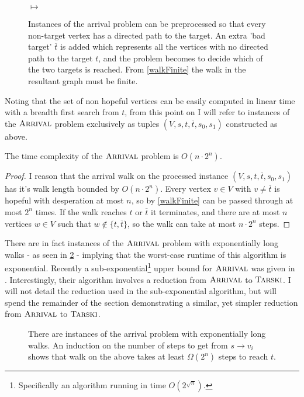 \begin{figure}[ht]
  \centering
  \raisebox{-0.62\height}{}
  \hfil
  $\mapsto$
  \hfil
  \raisebox{-0.5\height}{}
  \caption{Instances of the arrival problem can be preprocessed so that every non-target vertex
  has a directed path to the target. An extra 'bad target' $\overline{t}$ is added which represents
  all the vertices with no directed path to the target $t$, and the problem becomes to decide
  which of the two targets is reached. From \cref{walkFinite} 
  the walk in the resultant graph must be finite.}\label{arrivalPreprocess}
\end{figure}
Noting that the set of non hopeful vertices can be easily computed in linear time with a breadth first search
from $t$, from this point on I will refer
to instances of the $\textsc{Arrival}$ problem exclusively as tuples $(V, s, t, \overline{t}, s_0, s_1)$ 
constructed as above.
\begin{cor}
  The time complexity of the $\textsc{Arrival}$ problem is $O(n \cdot 2^n)$.
\end{cor}
\begin{proof}
  I reason that the arrival walk on the processed instance $(V, s, t, \overline{t}, s_0, s_1)$
  has it's walk length bounded by $O(n \cdot 2^n)$. Every vertex $v \in V$ with $v \neq \overline{t}$
  is hopeful with desperation at most $n$, so by \cref{walkFinite} can be passed through at most
  $2^{n}$ times. If the walk reaches $t$ or $\overline{t}$ it terminates, and there are at most
  $n$ vertices $w \in V$ such that $w \not\in \{t, \overline{t}\}$, so the walk can take at most
  $n \cdot 2^n$ steps.
\end{proof}
There are in fact instances of the $\textsc{Arrival}$ problem with exponentially long walks -
as seen in \cref{expLongArrival} - implying that the worst-case runtime of this algorithm is exponential.
Recently a sub-exponential\footnote{Specifically an algorithm running
in time $O(2^{\sqrt{n}})$.} upper bound for $\textsc{Arrival}$ was given in \citep{gärtner2021subexponential}.
Interestingly, their algorithm involves a reduction from $\textsc{Arrival}$ to $\textsc{Tarski}$. I will not detail
the reduction used in the sub-exponential algorithm, but will spend the remainder of the section
demonstrating a similar, yet simpler reduction from $\textsc{Arrival}$ to $\textsc{Tarski}$.
\begin{figure}[h]
  \centering
  
  \caption{There are instances of the arrival problem with exponentially long walks. An induction
  on the number of steps to get from $s \to v_i$ shows that walk on the above
  takes at least $\Omega(2^n)$ steps to reach $t$.}\label{expLongArrival}
\end{figure}
